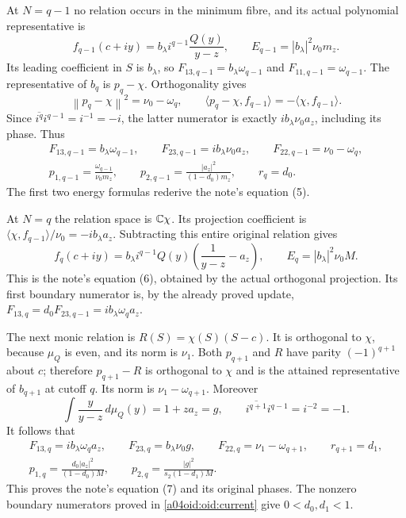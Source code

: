 \documentclass[11pt,a4paper]{article}
\providecommand{\norm}[1]{\left\lVert#1\right\rVert}
\begin{document}
At $N=q-1$ no relation occurs in the minimum fibre, and its actual
polynomial representative is
\[
 f_{q-1}(c+iy)=b_\lambda i^{q-1}\frac{Q(y)}{y-z},\qquad
 E_{q-1}=|b_\lambda|^2\nu_0m_z.
\]
Its leading coefficient in $S$ is $b_\lambda$, so
$F_{13,q-1}=b_\lambda\omega_{q-1}$ and
$F_{11,q-1}=\omega_{q-1}$. The representative of $b_q$ is
$p_q-\chi$. Orthogonality gives
\[
 \norm{p_q-\chi}^2=\nu_0-\omega_q,
 \qquad
 \langle p_q-\chi,f_{q-1}\rangle=-\langle\chi,f_{q-1}\rangle.
\]
Since $\overline{i^q}i^{q-1}=i^{-1}=-i$, the latter numerator is
exactly $i b_\lambda\nu_0a_z$, including its phase. Thus
\begin{equation}\label{a04oid:oid:lowfirst}
 \begin{gathered}
 F_{13,q-1}=b_\lambda\omega_{q-1},\qquad
 F_{23,q-1}=i b_\lambda\nu_0a_z,\qquad
 F_{22,q-1}=\nu_0-\omega_q,\\
 p_{1,q-1}=\frac{\omega_{q-1}}{\nu_0m_z},\qquad
 p_{2,q-1}=\frac{|a_z|^2}{(1-d_0)m_z},\qquad
 r_q=d_0.
 \end{gathered}
\end{equation}
The first two energy formulas rederive the note's equation (5).

At $N=q$ the relation space is $\mathbb C\chi$.
Its projection coefficient is
$\langle\chi,f_{q-1}\rangle/\nu_0=-i b_\lambda a_z$.
Subtracting this entire original relation gives
\begin{equation}\label{a04oid:oid:lowsecondlift}
 f_q(c+iy)=b_\lambda i^{q-1}Q(y)
 \left(\frac1{y-z}-a_z\right),\qquad
 E_q=|b_\lambda|^2\nu_0M.
\end{equation}
This is the note's equation (6), obtained by the actual orthogonal
projection. Its first boundary numerator is, by the already proved
update, $F_{13,q}=d_0F_{23,q-1}=i b_\lambda\omega_q a_z$.

The next monic relation is $R(S)=\chi(S)(S-c)$.
It is orthogonal to $\chi$, because $\mu_Q$ is even, and its norm
is $\nu_1$. Both $p_{q+1}$ and $R$ have parity $(-1)^{q+1}$
about $c$; therefore $p_{q+1}-R$ is orthogonal to $\chi$ and is
the attained representative of $b_{q+1}$ at cutoff $q$.
Its norm is $\nu_1-\omega_{q+1}$. Moreover
\[
 \int\frac{y}{y-z}\,d\mu_Q(y)=1+za_z=g,\qquad
 \overline{i^{q+1}}i^{q-1}=i^{-2}=-1.
\]
It follows that
\begin{equation}\label{a04oid:oid:lowsecond}
\begin{gathered}
 F_{13,q}=i b_\lambda\omega_q a_z,\qquad
 F_{23,q}=b_\lambda\nu_0g,\qquad
 F_{22,q}=\nu_1-\omega_{q+1},\qquad r_{q+1}=d_1,\\
 p_{1,q}=\frac{d_0|a_z|^2}{(1-d_0)M},\qquad
 p_{2,q}=\frac{|g|^2}{s_2(1-d_1)M}.
\end{gathered}
\end{equation}
This proves the note's equation (7) and its original phases. The
nonzero boundary numerators proved in \eqref{a04oid:oid:current} give
$0<d_0,d_1<1$.
\end{document}
